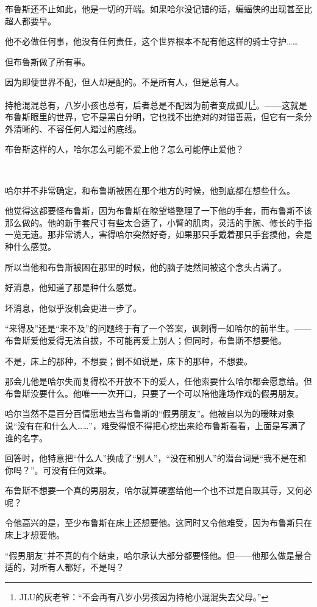 \documentclass[../main]{subfiles}
\begin{document}
布鲁斯还不止如此，他是一切的开端。如果哈尔没记错的话，蝙蝠侠的出现甚至比超人都要早。

他不必做任何事，他没有任何责任，这个世界根本不配有他这样的骑士守护……

但布鲁斯做了所有事。

因为即便世界不配，但人却是配的。不是所有人，但是总有人。

持枪混混总有，八岁小孩也总有，后者总是不配因为前者变成孤儿\footnote[1]{JLU的灰老爷：“不会再有八岁小男孩因为持枪小混混失去父母。”}。——这就是布鲁斯眼里的世界，它不是黑白分明，它也找不出绝对的对错善恶，但它有一条分外清晰的、不容任何人踏过的底线。

布鲁斯这样的人，哈尔怎么可能不爱上他？怎么可能停止爱他？

~\

哈尔并不非常确定，和布鲁斯被困在那个地方的时候，他到底都在想些什么。

他觉得这都要怪布鲁斯，因为布鲁斯在瞭望塔整理了一下他的手套，而布鲁斯不该那么做的。他的新手套尺寸有些太合适了，小臂的肌肉，灵活的手腕、修长的手指一览无遗。那非常诱人，害得哈尔突然好奇，如果那只手戴着那只手套摸他，会是种什么感觉。

所以当他和布鲁斯被困在那里的时候，他的脑子陡然间被这个念头占满了。

好消息，他知道了那是种什么感觉。

坏消息，他似乎没机会更进一步了。

“来得及”还是“来不及”的问题终于有了一个答案，讽刺得一如哈尔的前半生。——布鲁斯爱他爱得无法自拔，不可能再爱上别人；但同时，布鲁斯不想要他。

不是，床上的那种，不想要；倒不如说是，床下的那种，不想要。

那会儿他是哈尔失而复得松不开放不下的爱人，任他索要什么哈尔都会愿意给。但布鲁斯没要什么。他唯一一次开口，只要了一个可以陪他逢场作戏的假男朋友。

哈尔当然不是百分百情愿地去当布鲁斯的“假男朋友”。他被自以为的暧昧对象说“没有在和什么人……”，难受得恨不得把心挖出来给布鲁斯看看，上面是写满了谁的名字。

回答时，他特意把“什么人”换成了“别人”，“没在和别人”的潜台词是“我不是在和你吗？”。可没有任何效果。

布鲁斯不想要一个真的男朋友，哈尔就算硬塞给他一个也不过是自取其辱，又何必呢？

令他高兴的是，至少布鲁斯在床上还想要他。这同时又令他难受，因为布鲁斯只在床上才想要他。

“假男朋友”并不真的有个结束，哈尔承认大部分都要怪他。但——他那么做是最合适的，对所有人都好，不是吗？
\end{document}
